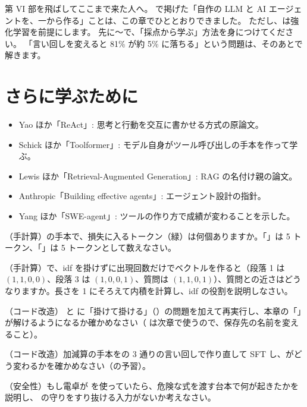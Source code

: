 第 VI 部を飛ばしてここまで来た人へ。
で掲げた「自作の LLM と AI エージェントを、一から作る」ことは、この章でひととおりできました。
ただし、は強化学習を前提にします。
先に〜で、「採点から学ぶ」方法を身につけてください。
「言い回しを変えると 81\% が約 5\% に落ちる」という問題は、そのあとで解きます。

\section*{さらに学ぶために}

\begin{itemize}
\item Yao ほか「ReAct」\cite{yao2023react}: 思考と行動を交互に書かせる方式の原論文。
\item Schick ほか「Toolformer」\cite{schick2023toolformer}: モデル自身がツール呼び出しの手本を作って学ぶ。
\item Lewis ほか「Retrieval-Augmented Generation」\cite{lewis2020retrieval}: RAG の名付け親の論文。
\item Anthropic「Building effective agents」\cite{anthropic2024agents}: エージェント設計の指針。
\item Yang ほか「SWE-agent」\cite{yang2024sweagent}: ツールの作り方で成績が変わることを示した。
\end{itemize}

\begin{exercises}
\item （手計算）の手本で、損失に入るトークン（緑）は何個ありますか。「」は 5 トークン、「」は 5 トークンとして数えなさい。
\item （手計算）で、idf を掛けずに出現回数だけでベクトルを作ると（段落 1 は $(1,1,0,0)$、段落 3 は $(1,0,0,1)$、質問は $(1,1,0,1)$）、質問との近さはどうなりますか。長さを 1 にそろえて内積を計算し、idf の役割を説明しなさい。
\item （コード改造） と  に「掛けて掛ける」（）の問題を加えて再実行し、本章の「」が解けるようになるか確かめなさい（ は次章で使うので、保存先の名前を変えること）。
\item （コード改造）加減算の手本をの 3 通りの言い回しで作り直して SFT し、がどう変わるかを確かめなさい（の予習）。
\item （安全性）もし電卓が  を使っていたら、危険な式を渡す台本で何が起きたかを説明し、 の守りをすり抜ける入力がないか考えなさい。
\end{exercises}
